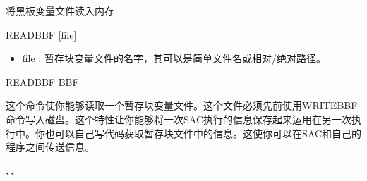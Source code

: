 \label{cmd:readbbf}

将黑板变量文件读入内存

\begin{SACSTX}
READBBF [file]
\end{SACSTX}

\begin{itemize}
\item file : 暂存块变量文件的名字，其可以是简单文件名或相对/绝对路径。
\end{itemize}

\begin{SACDFT}
READBBF BBF
\end{SACDFT}

这个命令使你能够读取一个暂存块变量文件。这个文件必须先前使用WRITEBBF命令写入磁盘。这个特性让你能够将一次SAC执行的信息保存起来运用在另一次执行中。你也可以自己写代码获取暂存块文件中的信息。这使你可以在SAC和自己的程序之间传送信息。

、、
